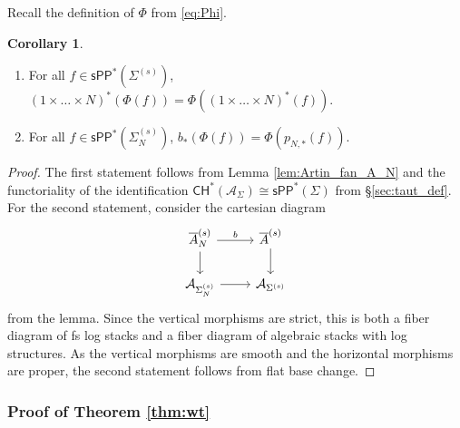 \documentclass[11pt]{article}
\def\CH{\mathsf{CH}}
\newcommand{\barA}{\overline{A}}
\newcommand{\sPP}{\mathsf{sPP}}
\newcommand{\spp}{\sPP}
\theoremstyle{definition}
\newtheorem{corollary}[definition]{Corollary}
\begin{document}
Recall the definition of $\Phi$ from \eqref{eq:Phi}.

\begin{corollary}\label{cor:push_pull_trop_geom}
\begin{enumerate}[label = (\alph*)]
	\item For all $f\in \spp^{\ast}(\Sigma^{(s)})$, $(1\times\dots\times N)^{\ast}(\Phi(f))=\Phi((1\times\dots\times N)^{\ast}(f))$.
	\item For all $f\in \spp^{\ast}(\Sigma_N^{(s)})$, $b_{\ast}(\Phi(f))=\Phi(p_{N,\ast}(f))$.
\end{enumerate}
\end{corollary}

\begin{proof}
    The first statement follows from Lemma \ref{lem:Artin_fan_A_N} and the functoriality of the identification $\CH^{\ast}(\mathcal{A}_{\Sigma}) \cong \spp^{\ast}(\Sigma)$ from \S\ref{sec:taut_def}.
    For the second statement, consider the cartesian diagram
    $$\begin{tikzcd} \barA_N^{(s)}\arrow[d]\arrow[r,"b"]&\barA^{(s)}\arrow[d]\\ \mathcal{A}_{\Sigma_N^{(s)}}\arrow[r]&\mathcal{A}_{\Sigma^{(s)}} \end{tikzcd}$$
    from the lemma.
    Since the vertical morphisms are strict, this is both a fiber diagram of fs log stacks and a fiber diagram of algebraic stacks with log structures.
    As the vertical morphisms are smooth and the horizontal morphisms are proper, the second statement follows from flat base change.
\end{proof}

\subsubsection{Proof of Theorem \ref{thm:wt}}
\end{document}

